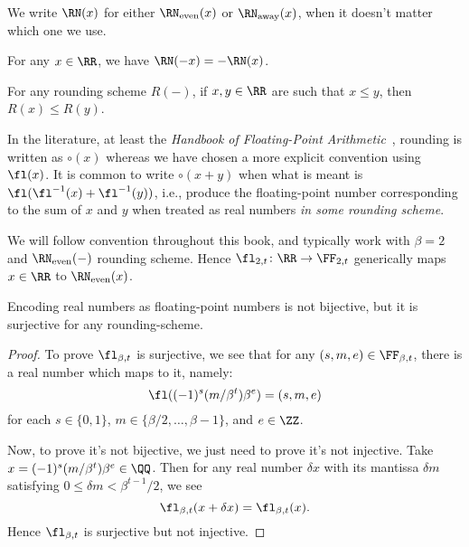\begin{notation}
  We write $\RN(x)$ for either $\RN_{\text{even}}(x)$ or $\RN_{\text{away}}(x)$,
  when it doesn't matter which one we use.
\end{notation}

\begin{thm}
  For any $x\in\RR$, we have $\RN(-x)=-\RN(x)$.
\end{thm}

\begin{thm}
  For any rounding scheme $R(-)$, if $x,y\in\RR$ are such that $x\leq
  y$,
  then $R(x)\leq R(y)$.
\end{thm}

\begin{notation}
In the literature, at least the \emph{Handbook of Floating-Point Arithmetic}~\cite{10.5555/3235984},
rounding is written as $\circ(x)$ whereas we have chosen a more explicit
convention using $\fl(x)$. It is common to write $\circ(x+y)$ when what
is meant is $\fl(\fl^{-1}(x)+\fl^{-1}(y))$, i.e., produce the
floating-point number corresponding to the sum of $x$ and $y$ when
treated as real numbers \emph{in some rounding scheme}.
\end{notation}

\begin{convention}
  We will follow  convention throughout this book, and
  typically work with $\beta=2$ and $\RN_{\text{even}}(-)$ rounding scheme.
  Hence $\fl_{2,t}\colon\RR\to\FF_{2,t}$ generically maps $x\in\RR$ to
  $\RN_{\text{even}}(x)$.
\end{convention}

\begin{thm}
Encoding real numbers as floating-point numbers is not bijective, but it
is surjective for any rounding-scheme.
\end{thm}
\begin{proof}
To prove $\fl_{\beta,t}$ is surjective, we see that for any $(s,m,e)\in\FF_{\beta,t}$,
there is a real number which maps to it, namely:
\begin{equation}
  \fl((-1)^{s}(m/\beta^{t})\beta^{e}) = (s,m,e)
\end{equation}
for each $s\in\{0,1\}$, $m\in\{\beta/2,\dots,\beta-1\}$, and $e\in\ZZ$.

Now, to prove it's not bijective, we just need to prove it's not
injective. Take $x = (-1)^{s}(m/\beta^{t})\beta^{e}\in\QQ$. Then for
any real number $\delta x$ with its mantissa $\delta m$ satisfying
$0\leq \delta m<\beta^{t-1}/2$, we see
\begin{equation}
  \fl_{\beta,t}(x + \delta x) = \fl_{\beta,t}(x).
\end{equation}
Hence $\fl_{\beta,t}$ is surjective but not injective.
\end{proof}

